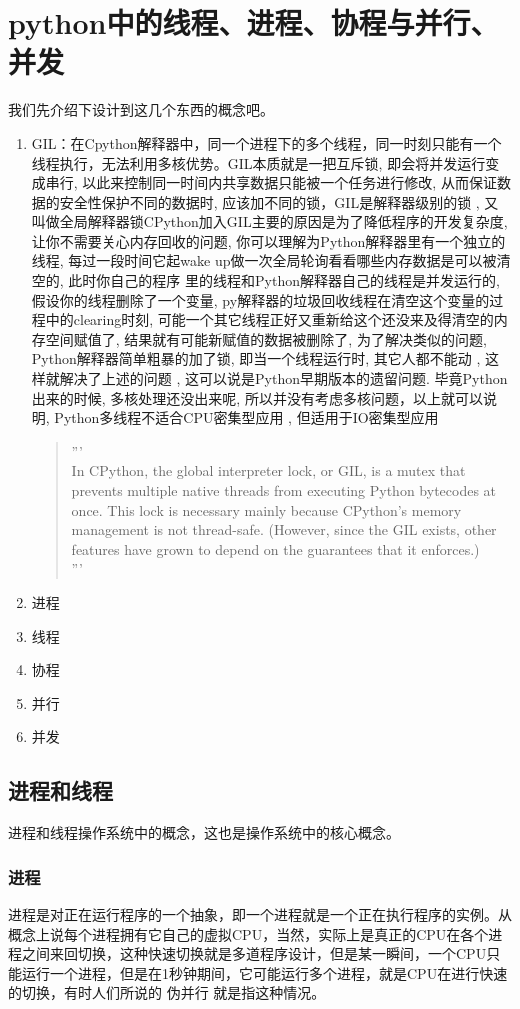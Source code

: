 \section{python中的线程、进程、协程与并行、并发}
我们先介绍下设计到这几个东西的概念吧。
\begin{enumerate}
    \item GIL：在Cpython解释器中，同一个进程下的多个线程，同一时刻只能有一个线程执行，无法利用多核优势。GIL本质就是一把互斥锁, 即会将并发运行变成串行, 以此来控制同一时间内共享数据只能被一个任务进行修改, 从而保证数据的安全性保护不同的数据时, 应该加不同的锁，GIL是解释器级别的锁 , 又叫做全局解释器锁CPython加入GIL主要的原因是为了降低程序的开发复杂度, 让你不需要关心内存回收的问题, 你可以理解为Python解释器里有一个独立的线程, 每过一段时间它起wake up做一次全局轮询看看哪些内存数据是可以被清空的, 此时你自己的程序 里的线程和Python解释器自己的线程是并发运行的, 假设你的线程删除了一个变量, py解释器的垃圾回收线程在清空这个变量的过程中的clearing时刻, 可能一个其它线程正好又重新给这个还没来及得清空的内存空间赋值了, 结果就有可能新赋值的数据被删除了, 为了解决类似的问题, Python解释器简单粗暴的加了锁, 即当一个线程运行时, 其它人都不能动 , 这样就解决了上述的问题 , 这可以说是Python早期版本的遗留问题. 毕竟Python出来的时候, 多核处理还没出来呢, 所以并没有考虑多核问题，以上就可以说明, Python多线程不适合CPU密集型应用 , 但适用于IO密集型应用
      \begin{quotation}
      '''\\
      In CPython, the global interpreter lock, or GIL, is a mutex that prevents multiple 
      native threads from executing Python bytecodes at once. This lock is necessary mainly 
      because CPython’s memory management is not thread-safe. (However, since the GIL 
      exists, other features have grown to depend on the guarantees that it enforces.)\\
      '''
      \end{quotation}
    \item 进程
    \item 线程
    \item 协程
    \item 并行
    \item 并发
\end{enumerate}

\subsection{进程和线程}
进程和线程操作系统中的概念，这也是操作系统中的核心概念。
\subsubsection{进程}
进程是对正在运行程序的一个抽象，即一个进程就是一个正在执行程序的实例。从概念上说每个进程拥有它自己的虚拟CPU，当然，实际上是真正的CPU在各个进程之间来回切换，这种快速切换就是多道程序设计，但是某一瞬间，一个CPU只能运行一个进程，但是在1秒钟期间，它可能运行多个进程，就是CPU在进行快速的切换，有时人们所说的 伪并行 就是指这种情况。

